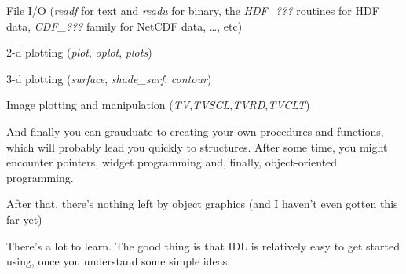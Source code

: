 \be

  \item File I/O (\textit{readf} for text and \textit{readu} for binary, the \textit{HDF\_???}
  routines for HDF data, \textit{CDF\_???} family for NetCDF data,
  \ldots, etc)

  \item 2-d plotting (\textit{plot}, \textit{oplot}, \textit{plots})

  \item 3-d plotting (\textit{surface}, \textit{shade\_surf},
  \textit{contour})

  \item Image plotting and manipulation (\textit{TV},\textit{TVSCL},\textit{TVRD},\textit{TVCLT})

\ee

  And finally you can grauduate to creating your own procedures and
  functions, which will probably lead you quickly to structures. After
  some time, you might encounter pointers, widget programming and,
  finally, object-oriented programming.

  After that, there's nothing left by object graphics (and I haven't
  even gotten this far yet)

  There's a lot to learn. The good thing is that IDL is relatively easy
  to get started using, once you understand some simple ideas.